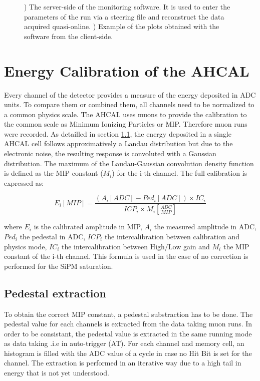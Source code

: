 \begin{figure}[htbp!]
\begin{subfigure}[t]{0.5\textwidth}
		\caption{} \label{fig:QtReco_Client}
	\end{subfigure}
	\caption{) The server-side of the monitoring software. It is used to enter the parameters of the run via a steering file and reconstruct the data acquired quasi-online. ) Example of the plots obtained with the software from the client-side.}
\end{figure}

\section{Energy Calibration of the AHCAL}

Every channel of the detector provides a measure of the energy deposited in ADC units. To compare them or combined them, all channels need to be normalized to a common physics scale. The AHCAL uses muons to provide the calibration to the common scale as Minimum Ionizing Particles or MIP. Therefore muon runs were recorded. As detailled in section \ref{}, the energy deposited in a single AHCAL cell follows approximatively a Landau distribution but due to the electronic noise, the resulting response is convoluted with a Gaussian distribution. The maximum of the Laudau-Gaussian convolution density function is defined as the MIP constant ($M_{i}$) for the i-th channel. The full calibration is expressed as:

\begin{equation}
	E_i [MIP] = \frac{(A_i [ADC] - Ped_i [ADC]) \times IC_i }{ICP_i \times M_{i} [\frac{ADC}{MIP}]}
\end{equation}

where $E_i$ is the calibrated amplitude in MIP, $A_i$ the measured amplitude in ADC, $Ped_i$ the pedestal in ADC, $ICP_i$ the intercalibration between calibration and physics mode, $IC_i$ the intercalibration between High/Low gain and $M_{i}$ the MIP constant of the i-th channel. This formula is used in the case of no correction is performed for the SiPM saturation.

\subsection{Pedestal extraction}

To obtain the correct MIP constant, a pedestal substraction has to be done. The pedestal value for each channels is extracted from the data taking muon runs. In order to be consistant, the pedestal value is extracted in the same running mode as data taking .i.e in auto-trigger (AT). For each channel and memory cell, an histogram is filled with the ADC value of a cycle in case no Hit Bit is set for the channel. The extraction is performed in an iterative way due to a high tail in energy that is not yet understood.

